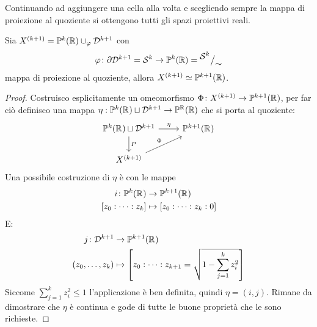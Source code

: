 Continuando ad aggiungere una cella alla volta e scegliendo sempre
la mappa di proiezione al quoziente si ottengono tutti gli spazi proiettivi reali.
\begin{lemma}%
  Sia $ X^{(k+1)} = \mathbb{P}^{k} (\mathbb{R}) \cup_\varphi \mathcal{D}^{k+1} $ con
  \[
    \varphi \colon \partial \mathcal{D}^{k+1} = \mathcal{S}^{k} \to \mathbb{P}^{k} (\mathbb{R}) = {^{\textstyle \mathcal{S}^{k}}\big/_{\textstyle \sim}}
  \]
  mappa di proiezione al quoziente, allora $ X^{(k+1)} \simeq \mathbb{P}^{k+1} (\mathbb{R}) $.
\end{lemma}
\begin{proof}
  Costruisco esplicitamente un omeomorfismo $ \Phi \colon X^{(k+1)} \to \mathbb{P}^{k+1}(\mathbb{R}^{}) $,
  per far ciò definisco una mappa $ \eta :  \mathbb{P}^{k}(\mathbb{R}^{}) \sqcup \mathcal{D}^{k+1} \to \mathbb{P}^{\mathbb{R}^{}} (\mathbb{R}) $
  che si porta al quoziente:
  \[
    \begin{tikzcd}
      \mathbb{P}^{k}(\RN{}) \sqcup \Disk{k+1} \arrow{r}{\eta} \arrow{d}{P} &  \mathbb{P}^{k+1}(\RN{}) \\
      X^{(k+1)} \arrow{ru}{\Phi}
    \end{tikzcd}
  \]
  Una possibile costruzione di $ \eta $ è con le mappe
  \begin{align*}
    i \colon \mathbb{P}^{k}(\mathbb{R}^{}) & \to \mathbb{P}^{k+1}(\mathbb{R}^{})  \\
    [z_0 : \dots : z_k] & \mapsto [z_0: \dots: z_k: 0]
  \end{align*}
  E:
  \begin{align*}
    j \colon \mathcal{D}^{k+1} & \to \mathbb{P}^{k+1}(\mathbb{R}^{}) \\
    (z_0, \dots, z_k) & \mapsto  \left[z_0: \dots: z_{k+1} = \sqrt{1 - \sum_{j=1}^k z_i^2}\right]
  \end{align*}
  Siccome $ \sum_{j=1}^k z_i^2 \leq 1 $ l'applicazione è ben definita, quindi $ \eta = (i,j) $.
  Rimane da dimostrare che $ \eta $ è continua e gode di tutte le buone proprietà che le
    sono richieste.
\end{proof}

